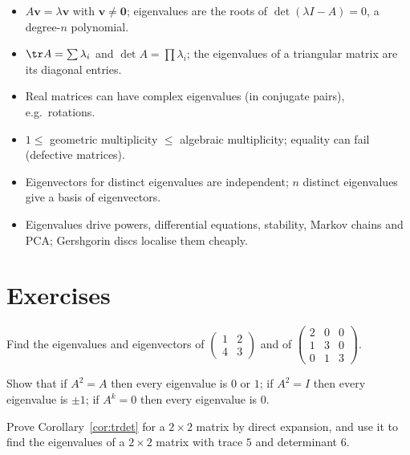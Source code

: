 \begin{summarybox}
\begin{itemize}
  \item $A\mathbf{v}=\lambda\mathbf{v}$ with $\mathbf{v}\ne\mathbf{0}$; eigenvalues are the roots of $\det(\lambda I-A)=0$, a degree-$n$ polynomial.
  \item $\tr A=\sum\lambda_i$ and $\det A=\prod\lambda_i$; the eigenvalues of a triangular matrix are its diagonal entries.
  \item Real matrices can have complex eigenvalues (in conjugate pairs), e.g.\ rotations.
  \item $1\le$ geometric multiplicity $\le$ algebraic multiplicity; equality can fail (defective matrices).
  \item Eigenvectors for distinct eigenvalues are independent; $n$ distinct eigenvalues give a basis of eigenvectors.
  \item Eigenvalues drive powers, differential equations, stability, Markov chains and PCA; Gershgorin discs localise them cheaply.
\end{itemize}
\end{summarybox}

\section{Exercises}

\begin{exercise}
Find the eigenvalues and eigenvectors of $\begin{pmatrix}1&2\\4&3\end{pmatrix}$ and of $\begin{pmatrix}2&0&0\\1&3&0\\0&1&3\end{pmatrix}$.
\end{exercise}

\begin{exercise}
Show that if $A^2=A$ then every eigenvalue is $0$ or $1$; if $A^2=I$ then every eigenvalue is $\pm1$; if $A^k=0$ then every eigenvalue is $0$.
\end{exercise}

\begin{exercise}
Prove Corollary~\ref{cor:trdet} for a $2\times2$ matrix by direct expansion, and use it to find the eigenvalues of a $2\times 2$ matrix with trace $5$ and determinant $6$.
\end{exercise}

